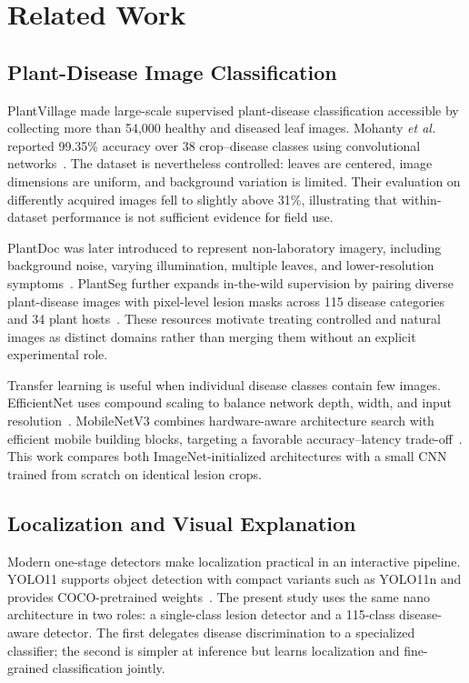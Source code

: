 \documentclass[conference]{IEEEtran}
\begin{document}
\section{Related Work}

\subsection{Plant-Disease Image Classification}

PlantVillage made large-scale supervised plant-disease classification accessible by collecting
more than 54,000 healthy and diseased leaf images. Mohanty \emph{et al.} reported 99.35\% accuracy
over 38 crop--disease classes using convolutional networks~\cite{mohanty2016plantvillage}. The
dataset is nevertheless controlled: leaves are centered, image dimensions are uniform, and
background variation is limited. Their evaluation on differently acquired images fell to slightly
above 31\%, illustrating that within-dataset performance is not sufficient evidence for field use.

PlantDoc was later introduced to represent non-laboratory imagery, including background noise,
varying illumination, multiple leaves, and lower-resolution symptoms~\cite{singh2020plantdoc}.
PlantSeg further expands in-the-wild supervision by pairing diverse plant-disease images with
pixel-level lesion masks across 115 disease categories and 34 plant hosts~\cite{wei2024plantseg}.
These resources motivate treating controlled and natural images as distinct domains rather than
merging them without an explicit experimental role.

Transfer learning is useful when individual disease classes contain few images. EfficientNet uses
compound scaling to balance network depth, width, and input resolution~\cite{tan2019efficientnet}.
MobileNetV3 combines hardware-aware architecture search with efficient mobile building blocks,
targeting a favorable accuracy--latency trade-off~\cite{howard2019mobilenetv3}. This work compares
both ImageNet-initialized architectures with a small CNN trained from scratch on identical lesion
crops.

\subsection{Localization and Visual Explanation}

Modern one-stage detectors make localization practical in an interactive pipeline. YOLO11 supports
object detection with compact variants such as YOLO11n and provides COCO-pretrained
weights~\cite{jocher2024yolo11}. The present study uses the same nano architecture in two roles: a
single-class lesion detector and a 115-class disease-aware detector. The first delegates disease
discrimination to a specialized classifier; the second is simpler at inference but learns
localization and fine-grained classification jointly.
\end{document}
